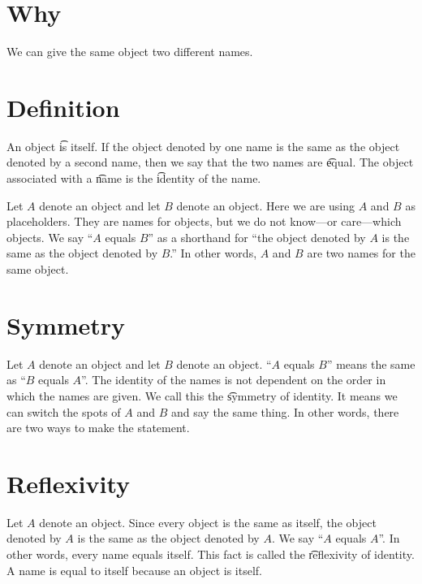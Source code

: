 

\section*{Why}

We can give the same object two different names.

\section*{Definition}

An object \t{is} itself.
If the object denoted by one name is the same as the object denoted by a second name, then we say that the two names are \t{equal}.
The object associated with a \t{name} is the \t{identity} of the name.

Let $A$ denote an object and let $B$ denote an object.
Here we are using $A$ and $B$ as placeholders.
They are names for objects, but we do not know---or care---which objects.
We say ``$A$ equals $B$'' as a shorthand for ``the object denoted by $A$ is the same as the object denoted by $B$.''
In other words, $A$ and $B$ are two names for the same object.

\section*{Symmetry}

Let $A$ denote an object and let $B$ denote an object.
``$A$ equals $B$'' means the same as ``$B$ equals $A$''.
The identity of the names is not dependent on the order in which the names are given.
We call this the \t{symmetry of identity}.
It means we can switch the spots of $A$ and $B$ and say the same thing.
In other words, there are two ways to make the statement.
%  


\section*{Reflexivity}

Let $A$ denote an object.
Since every object is the same as itself, the object denoted by $A$ is the same as the object denoted by $A$.
We say ``$A$ equals $A$''.
In other words, every name equals itself.
This fact is called the \t{reflexivity of identity}.
A name is equal to itself because an object is itself.

